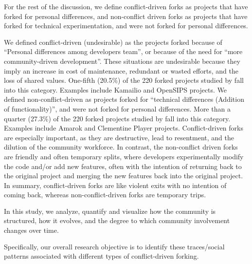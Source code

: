 \documentclass[12pt,letterpaper]{gthesis2}  %
\begin{document}


For the rest of the discussion, we define conflict-driven forks as projects that have forked for personal differences, and non-conflict driven forks as projects that have forked for technical experimentation, and were not forked for personal differences. 

We defined conflict-driven (undesirable) as the projects forked because of ``Personal differences among developers team'', or because of the need for ``more community-driven development''. These situations are undesirable because they imply an increase in cost of maintenance, redundant or wasted efforts, and the loss of shared values. One-fifth (20.5\%) of the 220 forked projects studied by \cite{Robles} fall into this category. Examples include Kamailio and OpenSIPS projects. We defined non-conflict-driven as projects forked for ``technical differences (Addition of functionality)'', and were not forked for personal differences. More than a quarter (27.3\%) of the 220 forked projects studied by \cite{Robles} fall into this category. Examples include Amarok and Clementine Player projects.
Conflict-driven forks are especially important, as they are destructive, lead to resentment, and the dilution of the community workforce. In contrast, the non-conflict driven forks are friendly and often temporary splits, where developers experimentally modify the code and/or add new features, often with the intention of returning back to the original project and merging the new features back into the original project. In summary, conflict-driven forks are like violent exits with no intention of coming back, whereas non-conflict-driven forks are temporary trips. 

In this study, we analyze, quantify and visualize how the community is structured, how it evolves, and the degree to which community involvement changes over time. 

Specifically, our overall research objective is to identify these traces/social patterns associated with different types of conflict-driven forking. 
\end{document}
